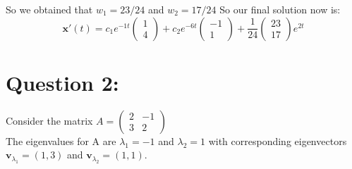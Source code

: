 \documentclass[12pt]{article}
\begin{document}
So we obtained that $w_1 = 23/24$ and $w_2 = 17/24$
So our final solution now is:
\[\mathbf{x}'(t) = c_1 e^{-1t} \begin{pmatrix} 1 \\ 4 \end{pmatrix} + c_2 e^{-6t} \begin{pmatrix} -1 \\ 1 \end{pmatrix} + \frac{1}{24}\begin{pmatrix} 23 \\ 17 \end{pmatrix} e^{2t}\]

\vspace{5cm}

\section*{Question 2:}
Consider the matrix $A = \begin{pmatrix} 2 & -1 \\ 3 & 2 \end{pmatrix}$ \\
The eigenvalues for A are
$\lambda_1 = -1$ and
$\lambda_2 = 1$ with corresponding eigenvectors 
$\mathbf{v}_{\lambda_1} = (1, 3)$ and 
$\mathbf{v}_{\lambda_2} = (1, 1)$.
\end{document}
